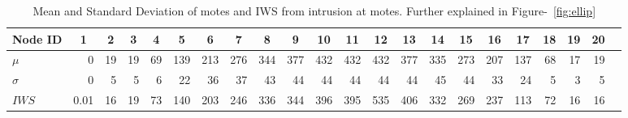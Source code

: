 \documentclass[conference,final]{IEEEtran}
\newcommand*{\bd}[1]{\multicolumn{1}{|c}{\bfseries #1}}
\begin{document}

\begin{table}[t!]
\centering
\begin{tabular}{|l|*{20}{r|}r}
\hline
\bd{Node ID}           & \bd{1} & \bd{2} & \bd{3} & \bd{4} & \bd{5} & \bd{6} & \bd{7} & \bd{8} & \bd{9} & \bd{10} & \bd{11} & \bd{12} & \bd{13} & \bd{14} & \bd{15} & \bd{16} & \bd{17} & \bd{18} & \bd{19} & \bd{20} \\
\hline

$\mu$            & 0 &19 & 19& 69&139 &213&276&344&377&432 &432 &432 &377 &335 &273 & 207&137 & 68 & 17 & 19 \\
$\sigma$		 & 0 & 5 & 5 & 6 & 22 & 36& 37&43 &44 & 44 & 44 & 44 & 44 & 45 & 44  & 33 & 24 & 5 & 3 & 5 \\
$\mathit{IWS}$
                 &0.01&16 &19 &73&140 &203&246&336&344&396&395 &535&406 &332 &269  &237 &113 & 72& 16 & 16 \\
\hline
\end{tabular}
\caption{Mean and Standard Deviation of motes and IWS from intrusion at motes. Further explained in Figure-~\ref{fig:ellip}}
\label{tab:ellip}
\end{table}
\end{document}
